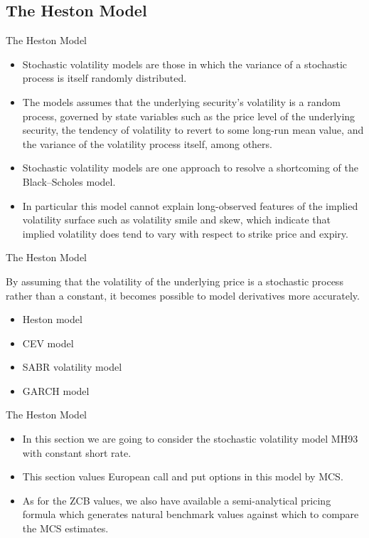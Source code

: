 \documentclass[11pt]{beamer}
\begin{document}
\subsection{The Heston Model}
\begin{frame}{The Heston Model}
\begin{itemize}
\item Stochastic volatility models are those in which the variance of a stochastic process is itself randomly distributed. \item The models assumes that the underlying security's volatility is a random process, governed by state variables such as the price level of the underlying security, the tendency of volatility to revert to some long-run mean value, and the variance of the volatility process itself, among others.
\item Stochastic volatility models are one approach to resolve a shortcoming of the Black–Scholes model. 
\item In particular this model cannot explain long-observed features of the implied volatility surface such as volatility smile and skew, which indicate that implied volatility does tend to vary with respect to strike price and expiry. 
\end{itemize}
\end{frame}
\begin{frame}{The Heston Model}

By assuming that the volatility of the underlying price is a stochastic process rather than a constant, it becomes possible to model derivatives more accurately.

\begin{itemize}
\item Heston model
\item CEV model
\item SABR volatility model
\item GARCH model
\end{itemize}
\end{frame}
\begin{frame}{The Heston Model}
\begin{itemize}
\item In this section we are going to consider the stochastic volatility model MH93 with constant short rate. 
\item This section values European call and put options in this model by MCS. 
\item As for the ZCB values, we also have available a semi-analytical pricing formula which generates natural benchmark values against which to compare the MCS estimates.
\end{itemize}
\end{frame}
\end{document}
